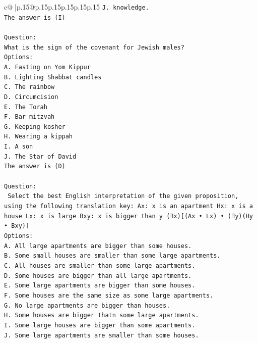\documentclass{article}
\begin{document}
{\begin{supertabular}{c@{$\;$}|p{.15\linewidth}@{}p{.15\linewidth}p{.15\linewidth}p{.15\linewidth}p{.15\linewidth}p{.15\linewidth}}
{{{\texttt{J. knowledge.} \\
\texttt{The answer is (I)} \\
\\ 
\texttt{Question:} \\
\texttt{What is the sign of the covenant for Jewish males?} \\
\texttt{Options:} \\
\texttt{A. Fasting on Yom Kippur} \\
\texttt{B. Lighting Shabbat candles} \\
\texttt{C. The rainbow} \\
\texttt{D. Circumcision} \\
\texttt{E. The Torah} \\
\texttt{F. Bar mitzvah} \\
\texttt{G. Keeping kosher} \\
\texttt{H. Wearing a kippah} \\
\texttt{I. A son} \\
\texttt{J. The Star of David} \\
\texttt{The answer is (D)} \\
\\ 
\texttt{Question:} \\
\texttt{ Select the best English interpretation of the given proposition, using the following translation key: Ax: x is an apartment Hx: x is a house Lx: x is large Bxy: x is bigger than y (∃x){[}(Ax • Lx) • (∃y)(Hy • Bxy){]}} \\
\texttt{Options:} \\
\texttt{A. All large apartments are bigger than some houses.} \\
\texttt{B. Some small houses are smaller than some large apartments.} \\
\texttt{C. All houses are smaller than some large apartments.} \\
\texttt{D. Some houses are bigger than all large apartments.} \\
\texttt{E. Some large apartments are bigger than some houses.} \\
\texttt{F. Some houses are the same size as some large apartments.} \\
\texttt{G. No large apartments are bigger than houses.} \\
\texttt{H. Some houses are bigger thatn some large apartments.} \\
\texttt{I. Some large houses are bigger than some apartments.} \\
\texttt{J. Some large apartments are smaller than some houses.} \\
            }
        }
    }
     \\ \\


\end{supertabular}}
\end{document}
